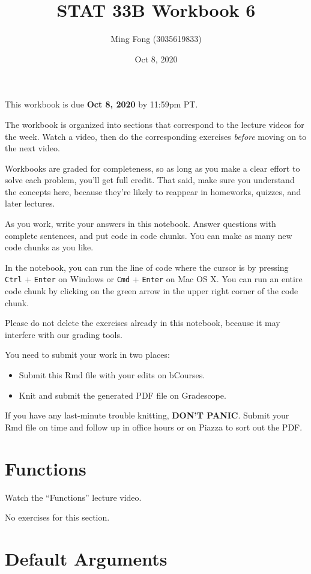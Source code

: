 \documentclass[
]{article}
\title{STAT 33B Workbook 6}
\author{Ming Fong (3035619833)}
\date{Oct 8, 2020}
\providecommand{\tightlist}{%
  \setlength{\itemsep}{0pt}\setlength{\parskip}{0pt}}
\begin{document}
\maketitle

This workbook is due \textbf{Oct 8, 2020} by 11:59pm PT.

The workbook is organized into sections that correspond to the lecture
videos for the week. Watch a video, then do the corresponding exercises
\emph{before} moving on to the next video.

Workbooks are graded for completeness, so as long as you make a clear
effort to solve each problem, you'll get full credit. That said, make
sure you understand the concepts here, because they're likely to
reappear in homeworks, quizzes, and later lectures.

As you work, write your answers in this notebook. Answer questions with
complete sentences, and put code in code chunks. You can make as many
new code chunks as you like.

In the notebook, you can run the line of code where the cursor is by
pressing \texttt{Ctrl} + \texttt{Enter} on Windows or \texttt{Cmd} +
\texttt{Enter} on Mac OS X. You can run an entire code chunk by clicking
on the green arrow in the upper right corner of the code chunk.

Please do not delete the exercises already in this notebook, because it
may interfere with our grading tools.

You need to submit your work in two places:

\begin{itemize}
\tightlist
\item
  Submit this Rmd file with your edits on bCourses.
\item
  Knit and submit the generated PDF file on Gradescope.
\end{itemize}

If you have any last-minute trouble knitting, \textbf{DON'T PANIC}.
Submit your Rmd file on time and follow up in office hours or on Piazza
to sort out the PDF.

\hypertarget{functions}{%
\section{Functions}\label{functions}}

Watch the ``Functions'' lecture video.

No exercises for this section.

\hypertarget{default-arguments}{%
\section{Default Arguments}\label{default-arguments}}
\end{document}
